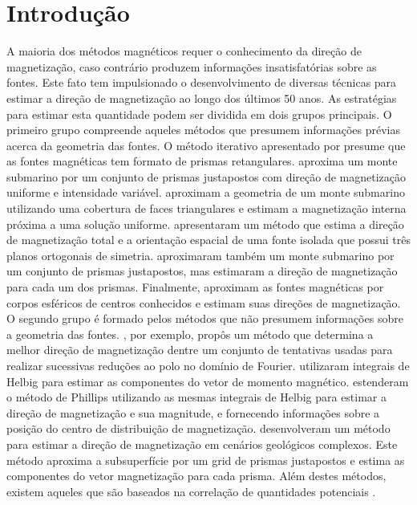 \chapter{Introdução}
\label{chap:introducao}

A maioria dos métodos magnéticos requer o conhecimento da direção de magnetização, caso contrário produzem informações insatisfatórias sobre as fontes. Este fato tem impulsionado o desenvolvimento de diversas técnicas para estimar a direção de magnetização ao longo dos últimos 50 anos. As estratégias para estimar esta quantidade podem ser dividida em dois grupos principais. O primeiro grupo compreende aqueles métodos que presumem informações prévias acerca da geometria das fontes. O método iterativo apresentado por \cite{bhattacharyya1966} presume que as fontes magnéticas tem formato de prismas retangulares. \cite{emilia_massey_1974} aproxima um monte submarino por um conjunto de prismas justapostos com direção de magnetização uniforme e intensidade variável. \cite{parker_etal_1987} aproximam a geometria de um monte submarino utilizando uma cobertura de faces triangulares e estimam a magnetização interna próxima a uma solução uniforme. \cite{parker_etal_1987} apresentaram um método que estima a direção de magnetização total e a orientação espacial de uma fonte isolada que possui três planos ortogonais de simetria. \cite{kubota2005} aproximaram também um monte submarino por um conjunto de prismas justapostos, mas estimaram a direção de magnetização para cada um dos prismas. Finalmente, \cite{oliveirajr_etal_2015} aproximam as fontes magnéticas por corpos esféricos de centros conhecidos e estimam suas direções de magnetização. O segundo grupo é formado pelos métodos que não presumem informações sobre a geometria das fontes. \cite{fedi_etal_1994}, por exemplo, propôs um método que determina a melhor direção de magnetização dentre um conjunto de tentativas usadas para realizar sucessivas reduções ao polo no domínio de Fourier. \cite{phillips2005} utilizaram integrais de Helbig para estimar as componentes do vetor de momento magnético. \cite{tontini_pedersen_2008} estenderam o método de Phillips utilizando as mesmas integrais de Helbig para estimar a direção de magnetização e sua magnitude, e fornecendo informações sobre a posição do centro de distribuição de magnetização. \cite{lelievre_oldenburg_2009} desenvolveram um método para estimar a direção de magnetização em cenários geológicos complexos. Este método aproxima a subsuperfície por um grid de prismas justapostos e estima as componentes do vetor magnetização para cada prisma. Além destes métodos, existem aqueles que são baseados na correlação de quantidades potenciais \citep[e.g.,][]{dannemiller_li_2006,gerovska_etal_2009,liu_etal_2015,zhang_etal_2018}. 

